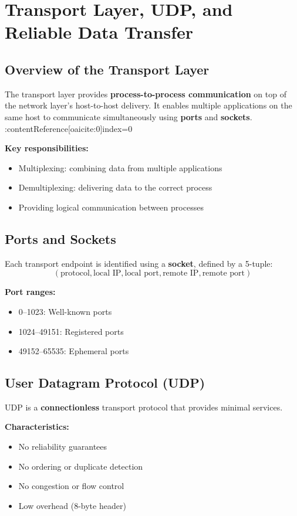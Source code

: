 \section{Transport Layer, UDP, and Reliable Data Transfer}

\subsection{Overview of the Transport Layer}
The transport layer provides \textbf{process-to-process communication} on top of the network layer's host-to-host delivery. It enables multiple applications on the same host to communicate simultaneously using \textbf{ports} and \textbf{sockets}. :contentReference[oaicite:0]{index=0}

\textbf{Key responsibilities:}
\begin{itemize}
    \item Multiplexing: combining data from multiple applications
    \item Demultiplexing: delivering data to the correct process
    \item Providing logical communication between processes
\end{itemize}

\subsection{Ports and Sockets}
Each transport endpoint is identified using a \textbf{socket}, defined by a 5-tuple:
\[
(\text{protocol}, \text{local IP}, \text{local port}, \text{remote IP}, \text{remote port})
\]

\textbf{Port ranges:}
\begin{itemize}
    \item 0--1023: Well-known ports
    \item 1024--49151: Registered ports
    \item 49152--65535: Ephemeral ports
\end{itemize}

\subsection{User Datagram Protocol (UDP)}
UDP is a \textbf{connectionless} transport protocol that provides minimal services.

\textbf{Characteristics:}
\begin{itemize}
    \item No reliability guarantees
    \item No ordering or duplicate detection
    \item No congestion or flow control
    \item Low overhead (8-byte header)
\end{itemize}

